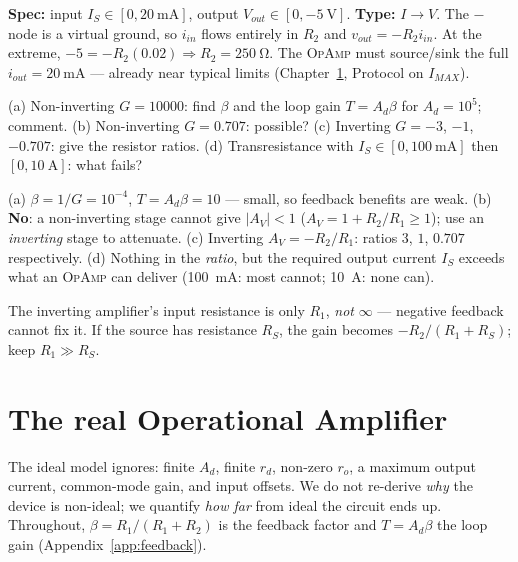 \documentclass[11pt,a4paper,oneside]{book}
\newcommand{\Ad}{A_d}
\newcommand{\op}{\textsc{OpAmp}}
\begin{document}
\begin{wexample}
\textbf{Spec:} input $I_S\in[0,\qty{20}{\milli\ampere}]$, output
$V_{out}\in[0,\qty{-5}{\volt}]$. \textbf{Type:} $I\!\to\!V$. The $-$ node is a
virtual ground, so $i_{in}$ flows entirely in $R_2$ and
$v_{out}=-R_2 i_{in}$. At the extreme, $-5=-R_2(0.02)\Rightarrow
R_2=\qty{250}{\ohm}$. The \op{} must source/sink the full
$i_{out}=\qty{20}{\milli\ampere}$ --- already near typical limits
(Chapter~\ref{ch:real}, Protocol on $I_{MAX}$).
\end{wexample}

\begin{exercise}
(a) Non-inverting $G=10000$: find $\beta$ and the loop gain $T=\Ad\beta$ for
$\Ad=10^5$; comment. (b) Non-inverting $G=0.707$: possible? (c) Inverting
$G=-3$, $-1$, $-0.707$: give the resistor ratios. (d) Transresistance with
$I_S\in[0,\qty{100}{\milli\ampere}]$ then $[0,\qty{10}{\ampere}]$: what fails?
\end{exercise}
\begin{solution}
(a) $\beta=1/G=10^{-4}$, $T=\Ad\beta=10$ --- small, so feedback benefits are
weak. (b) \textbf{No}: a non-inverting stage cannot give $|A_V|<1$
($A_V=1+R_2/R_1\ge1$); use an \emph{inverting} stage to attenuate. (c) Inverting
$A_V=-R_2/R_1$: ratios $3$, $1$, $0.707$ respectively. (d) Nothing in the
\emph{ratio}, but the required output current $I_S$ exceeds what an \op{} can
deliver (\qty{100}{\milli\ampere}: most cannot; \qty{10}{\ampere}: none can).
\end{solution}

\begin{warning}
The inverting amplifier's input resistance is only $R_1$, \emph{not} $\infty$ ---
negative feedback cannot fix it. If the source has resistance $R_S$, the gain
becomes $-R_2/(R_1+R_S)$; keep $R_1\gg R_S$.
\end{warning}

\chapter{The real Operational Amplifier}\label{ch:real}

The ideal model ignores: finite $\Ad$, finite $r_d$, non-zero $r_o$, a maximum
output current, common-mode gain, and input offsets. We do not re-derive
\emph{why} the device is non-ideal; we quantify \emph{how far} from ideal the
circuit ends up. Throughout, $\beta=R_1/(R_1+R_2)$ is the feedback factor and
$T=\Ad\beta$ the loop gain (Appendix~\ref{app:feedback}).
\end{document}
